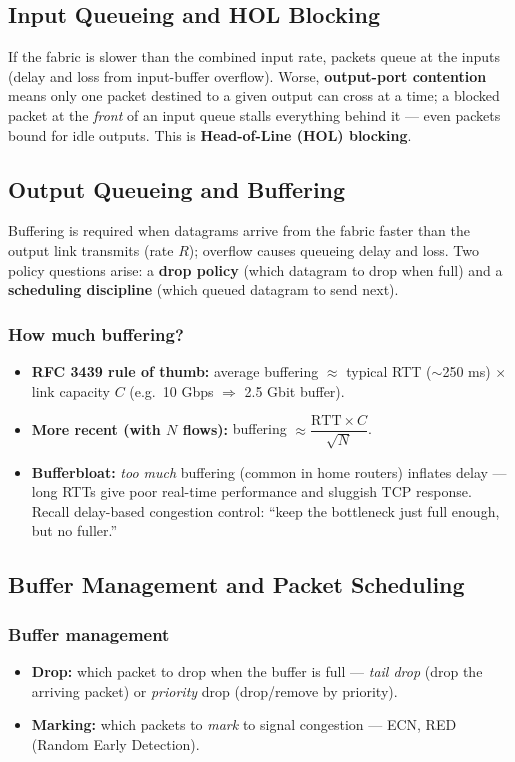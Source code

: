 \documentclass[hidelinks]{article}
\begin{document}
\subsection{Input Queueing and HOL Blocking}

If the fabric is slower than the combined input rate, packets queue at the
inputs (delay and loss from input-buffer overflow). Worse,
\textbf{output-port contention} means only one packet destined to a given
output can cross at a time; a blocked packet at the \emph{front} of an input
queue stalls everything behind it --- even packets bound for idle outputs.
This is \textbf{Head-of-Line (HOL) blocking}.

\subsection{Output Queueing and Buffering}

Buffering is required when datagrams arrive from the fabric faster than the
output link transmits (rate $R$); overflow causes queueing delay and loss.
Two policy questions arise: a \textbf{drop policy} (which datagram to drop
when full) and a \textbf{scheduling discipline} (which queued datagram to
send next).

\subsubsection{How much buffering?}
\begin{itemize}
    \item \textbf{RFC 3439 rule of thumb:} average buffering $\approx$ typical
    RTT ($\sim$250 ms) $\times$ link capacity $C$
    (e.g.\ 10 Gbps $\Rightarrow$ 2.5 Gbit buffer).
    \item \textbf{More recent (with $N$ flows):} buffering
    $\approx \dfrac{\text{RTT}\times C}{\sqrt{N}}$.
    \item \textbf{Bufferbloat:} \emph{too much} buffering (common in home
    routers) inflates delay --- long RTTs give poor real-time performance and
    sluggish TCP response. Recall delay-based congestion control: ``keep the
    bottleneck just full enough, but no fuller.''
\end{itemize}

\subsection{Buffer Management and Packet Scheduling}

\subsubsection{Buffer management}
\begin{itemize}
    \item \textbf{Drop:} which packet to drop when the buffer is full ---
    \emph{tail drop} (drop the arriving packet) or \emph{priority} drop
    (drop/remove by priority).
    \item \textbf{Marking:} which packets to \emph{mark} to signal congestion
    --- ECN, RED (Random Early Detection).
\end{itemize}
\end{document}
